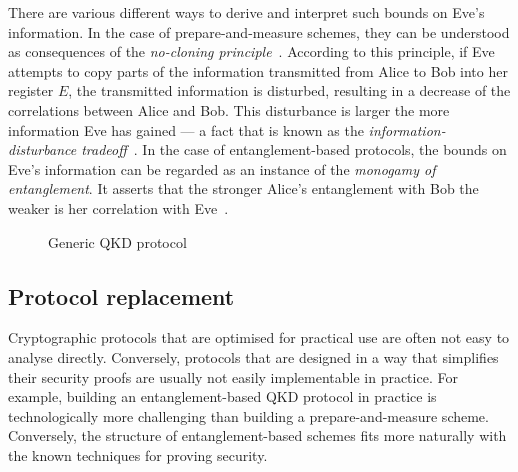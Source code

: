 There are various different ways to derive and interpret such bounds on Eve's information. In the case of prepare-and-measure schemes, they can be understood as consequences of the \emph{no-cloning principle}~\cite{Wootters82}. According to this principle, if Eve attempts to copy parts of the information transmitted from Alice to Bob into her register $E$,  the transmitted information is disturbed, resulting in a decrease of the correlations between Alice and Bob. This disturbance is larger the more information Eve has gained --- a fact that is known as the \emph{information-disturbance tradeoff}~\cite{Fuchs98}. In the case of entanglement-based protocols, the bounds on Eve's information can be regarded as an instance of the \emph{monogamy of entanglement}. It asserts that the stronger Alice's entanglement with Bob the weaker is her correlation with Eve~\cite{Coffman00,Terhal04,KoashiWinter04}. 


\begin{figure}
\noindent{}
\caption{Generic QKD protocol \label{fig:GenericQKD}}
\end{figure}


\subsection{Protocol replacement} 

Cryptographic protocols that are optimised for practical use are often not easy to analyse directly. Conversely, protocols that are designed in a way that simplifies their security proofs are usually not easily implementable in practice. For example, building an entanglement-based QKD protocol in practice is technologically more challenging than building a  prepare-and-measure scheme. Conversely, the structure of entanglement-based schemes fits more naturally with the known techniques for proving security.

